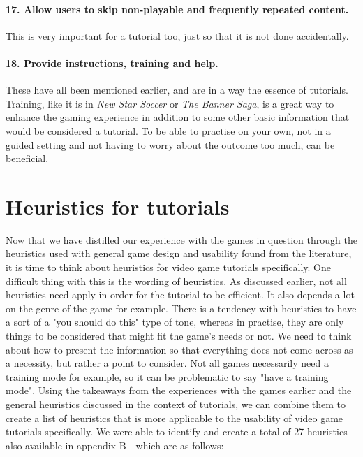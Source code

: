 \paragraph{17. Allow users to skip non-playable and frequently repeated content.} This is very important for a tutorial too, just so that it is not done accidentally.

\paragraph{18. Provide instructions, training and help.} These have all been mentioned earlier, and are in a way the essence of tutorials. Training, like it is in \textit{New Star Soccer} or \textit{The Banner Saga}, is a great way to enhance the gaming experience in addition to some other basic information that would be considered a tutorial. To be able to practise on your own, not in a guided setting and not having to worry about the outcome too much, can be beneficial.

\section{Heuristics for tutorials}
Now that we have distilled our experience with the games in question through the heuristics used with general game design and usability found from the literature, it is time to think about heuristics for video game tutorials specifically. One difficult thing with this is the wording of heuristics. As discussed earlier, not all heuristics need apply in order for the tutorial to be efficient. It also depends a lot on the genre of the game for example. There is a tendency with heuristics to have a sort of a "you should do this" type of tone, whereas in practise, they are only things to be considered that might fit the game's needs or not. We need to think about how to present the information so that everything does not come across as a necessity, but rather a point to consider. Not all games necessarily need a training mode for example, so it can be problematic to say "have a training mode". Using the takeaways from the experiences with the games earlier and the general heuristics discussed in the context of tutorials, we can combine them to create a list of heuristics that is more applicable to the usability of video game tutorials specifically. We were able to identify and create a total of 27 heuristics---also available in appendix B---which are as follows:

